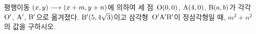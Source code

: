평행이동 $(x{,}\mkern3mu\mathopen{}y)\longrightarrow(x+m{,}\mkern3mu\mathopen{}y+n)$에 의하여 세 점~$\mathrm{O}(0{,}\mkern3mu\mathopen{}0)$, $\mathrm{A}(4{,}\mkern3mu\mathopen{}0)$, $\mathrm{B}(a{,}\mkern3mu\mathopen{}b)$가 각각 $\mathrm{O'}$, $\mathrm{A'}$, $\mathrm{B'}$으로 옮겨졌다. $\mathrm{B'}(5{,}\mkern3mu\mathopen{}4\sqrt{3})$이고 삼각형~$\mathrm{O'A'B'}$이 정삼각형일 때, $m^2+n^2$의 값을 구하시오. 
